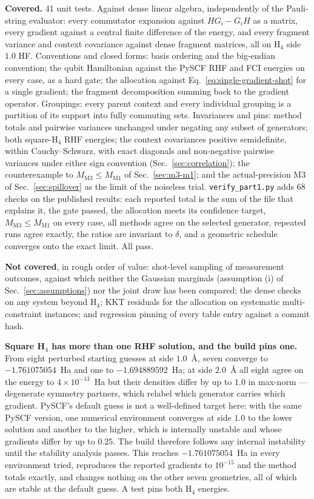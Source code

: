 \documentclass[10pt]{article}
\begin{document}
\textbf{Covered.} 41 unit tests. Against dense linear algebra, independently of
the Pauli-string evaluator: every commutator expansion against $HG_i-G_iH$ as a
matrix, every gradient against a central finite difference of the energy, and every
fragment variance and context covariance against dense fragment matrices, all on
H$_4$ side $1.0$ HF. Conventions and closed forms: basis ordering and the
big-endian convention; the qubit Hamiltonian against the PySCF RHF and FCI
energies on every case, as a hard gate; the allocation against
Eq.~\eqref{eq:single-gradient-shot} for a single gradient; the fragment
decomposition summing back to the gradient operator. Groupings: every parent
context and every individual grouping is a partition of its support into fully
commuting sets. Invariances and pins: method totals and pairwise variances
unchanged under negating any subset of generators; both square-H$_4$ RHF energies;
the context covariances positive semidefinite, within Cauchy--Schwarz, with exact
diagonals and non-negative pairwise variances under either sign convention
(Sec.~\ref{sec:correlation}); the counterexample to $M_{\mathrm{M3}}\le
M_{\mathrm{M1}}$ of Sec.~\ref{sec:m3-m1}; and the actual-precision M3 of
Sec.~\ref{sec:spillover} as the limit of the noiseless trial.
\texttt{verify\_part1.py} adds 68 checks on the published results: each reported
total is the sum of the file that explains it, the gate passed, the allocation
meets its confidence target, $M_{\mathrm{M3}}\le M_{\mathrm{M1}}$ on every case,
all methods agree on the selected generator, repeated runs agree exactly, the
ratios are invariant to $\delta$, and a geometric schedule converges onto the exact
limit. All pass.

\textbf{Not covered}, in rough order of value: shot-level sampling of measurement
outcomes, against which neither the Gaussian marginals (assumption (i) of
Sec.~\ref{sec:assumptions}) nor the joint draw has been compared; the dense checks
on any system beyond H$_4$; KKT residuals for the allocation on systematic
multi-constraint instances; and regression pinning of every table entry against a
commit hash.

\textbf{Square H$_4$ has more than one RHF solution, and the build pins one.}
From eight perturbed starting guesses at side $1.0$~\si{\angstrom}, seven converge
to $-1.761075054$~Ha and one to $-1.694889592$~Ha; at side
$2.0$~\si{\angstrom} all eight agree on the energy to $4\times10^{-13}$~Ha but
their densities differ by up to $1.0$ in max-norm --- degenerate symmetry
partners, which relabel which generator carries which gradient. PySCF's default
guess is not a well-defined target here: with the same PySCF version, one
numerical environment converges at side $1.0$ to the lower solution and another to
the higher, which is internally unstable and whose gradients differ by up to
$0.25$. The build therefore follows any internal instability until the stability
analysis passes. This reaches $-1.761075054$~Ha in every environment tried,
reproduces the reported gradients to $10^{-15}$ and the method totals exactly, and
changes nothing on the other seven geometries, all of which are stable at the
default guess. A test pins both H$_4$ energies.
\end{document}
